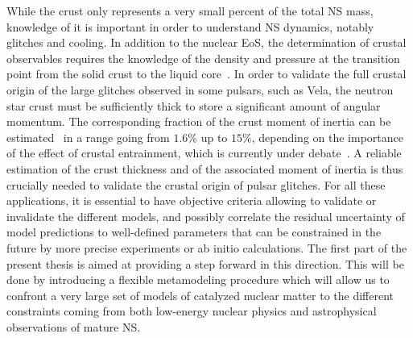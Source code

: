 While the crust only represents a very small percent of the total NS mass, 
knowledge of it is important in order to understand NS dynamics, notably 
glitches and cooling. In addition to the nuclear EoS, the determination of
crustal observables requires the knowledge of the density and pressure at the
transition point from the solid crust to the liquid 
core~\cite{Piekarewicz2014}.
In order to validate the full crustal origin of the large glitches observed in 
some pulsars, such as Vela, the neutron star crust must be sufficiently thick 
to store a significant amount of angular momentum. The corresponding fraction 
of the crust moment of inertia can be 
estimated~\cite{Link1999,Andersson2012,Delsate2016} in a range going from 
$1.6\%$ up to $15\%$, depending on the importance of the effect of crustal 
entrainment, which is currently under debate~\cite{Martin2016,Watanabe2017}. A 
reliable estimation of the crust thickness and of the associated moment of 
inertia is thus crucially needed to validate the crustal origin of 
pulsar glitches.
%
For all these applications, it is essential to have objective criteria allowing 
to validate or invalidate the different models, and possibly correlate the 
residual uncertainty of model predictions to well-defined parameters that can 
be constrained in the future by more precise experiments or ab initio 
calculations. The first part of the present thesis is aimed at providing a step 
forward in this direction. This will be done by introducing a flexible 
metamodeling procedure which will allow us to confront a very large set of 
models of catalyzed nuclear matter to the different constraints coming from 
both low-energy nuclear physics and astrophysical observations of mature 
NS. 

